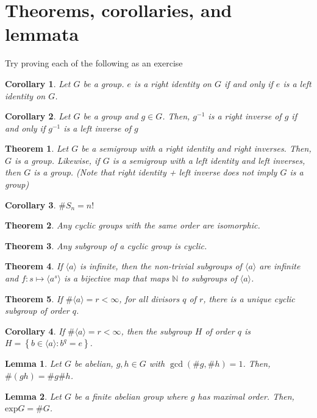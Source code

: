 \documentclass{article}
\newtheorem{theorem}{Theorem}[section]
\newtheorem{corollary}{Corollary}[section]
\newtheorem{lemma}{Lemma}[section]
\newcommand{\set}[1]{\left\{ #1 \right\}}
\theoremstyle{definition}
\begin{document}
\section{Theorems, corollaries, and lemmata}
Try proving each of the following as an exercise
\begin{corollary}
   Let $G$ be a group. $e$ is a right identity on $G$ if and only if $e$ is a left identity on $G$.
\end{corollary}
\begin{corollary}
    Let $G$ be a group and $g \in G$. Then, $g^{-1}$ is a right inverse of $g$ if and only if $g^{-1}$ is a left inverse of $g$
\end{corollary}
\begin{theorem}
    Let $G$ be a semigroup with a right identity and right inverses. Then, $G$ is a group. Likewise, if $G$ is a semigroup with a left identity and left inverses, then $G$ is a group. (Note that right identity + left inverse does not imply $G$ is a group)
\end{theorem}
\begin{corollary}
    $\#S_n = n!$
\end{corollary}
\begin{theorem}
    Any cyclic groups with the same order are isomorphic.
\end{theorem}
\begin{theorem}
Any subgroup of a cyclic group is cyclic. 
\end{theorem}
\begin{theorem}
    If $\langle a \rangle$ is infinite, then the non-trivial subgroups of $\langle a \rangle$ are infinite and $f: s \mapsto \langle a^s \rangle$ is a bijective map that maps $\mathbb{N}$ to subgroups of $\langle a \rangle$. 
\end{theorem}
\begin{theorem}
    If $\# \langle a \rangle = r < \infty$, for all divisors $q$ of $r$, there is a unique cyclic subgroup of order $q$.
\end{theorem}
\begin{corollary}
    If $\# \langle a \rangle = r < \infty$, then the subgroup $H$ of order $q$ is $H = \set{b \in \langle a \rangle : b^q = e}$.
\end{corollary}
\begin{lemma}
    Let $G$ be abelian, $g,h \in G$ with $\gcd(\#g,\#h)=1$. Then, $\#(gh)=\#g \#h$.
\end{lemma}
\begin{lemma}
    Let $G$ be a finite abelian group where $g$ has maximal order. Then, $\mathrm{exp}G = \# G$.
\end{lemma}
\end{document}
